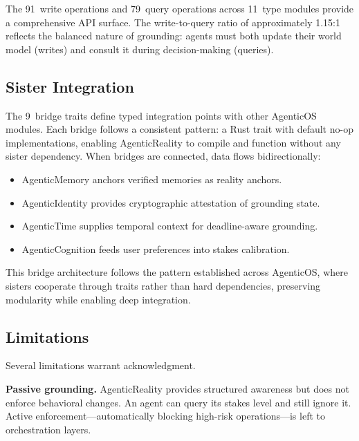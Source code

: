 \documentclass[10pt, twocolumn]{article}
\begin{document}
The 91~write operations and 79~query operations across 11~type modules provide a comprehensive API surface. The write-to-query ratio of approximately 1.15:1 reflects the balanced nature of grounding: agents must both update their world model (writes) and consult it during decision-making (queries).

\subsection{Sister Integration}
\label{sec:integration}

The 9~bridge traits define typed integration points with other AgenticOS modules. Each bridge follows a consistent pattern: a Rust trait with default no-op implementations, enabling AgenticReality to compile and function without any sister dependency. When bridges are connected, data flows bidirectionally:

\begin{itemize}[nosep, leftmargin=*]
  \item AgenticMemory anchors verified memories as reality anchors.
  \item AgenticIdentity provides cryptographic attestation of grounding state.
  \item AgenticTime supplies temporal context for deadline-aware grounding.
  \item AgenticCognition feeds user preferences into stakes calibration.
\end{itemize}

This bridge architecture follows the pattern established across AgenticOS, where sisters cooperate through traits rather than hard dependencies, preserving modularity while enabling deep integration.

\subsection{Limitations}
\label{sec:limitations}

Several limitations warrant acknowledgment.

\textbf{Passive grounding.} AgenticReality provides structured awareness but does not enforce behavioral changes. An agent can query its stakes level and still ignore it. Active enforcement---automatically blocking high-risk operations---is left to orchestration layers.
\end{document}
